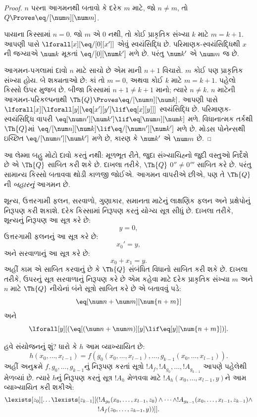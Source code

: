 \begin{proof}
$n$ પરના આગમનથી
બતાવો કે દરેક $m$
માટે, જો $n \neq m$,
તો $Q \Proves \eq/[\num n][\num m]$.

પાયાના કિસ્સામાં
$n = 0$. જો $m$
એ $0$ નથી, તો
કોઈ પ્રાકૃતિક
સંખ્યા $k$ માટે
$m = k + 1$.
આપણી પાસે
$\lforall[x][\eq/[0][x']]$
એવું સ્વયંસિદ્ધિ છે.
પરિમાણક-સ્વયંસિદ્ધિથી
$x$ની જગ્યાએ
$\num k$ મૂકતાં
$\eq/[0][\num k']$
મળે છે. પરંતુ
$\num k'$ એ
$\num m$ જ છે.

આગમન-પગલામાં
દાવો $n$ માટે સાચો
છે એમ માની $n+1$
વિચારો. $m$ કોઈ
પણ પ્રાકૃતિક
સંખ્યા હોય. બે
શક્યતાઓ છે:
કાં તો $m = 0$,
અથવા કોઈ $k$
માટે $m = k+1$.
પહેલો કિસ્સો
ઉપર મુજબ છે.
બીજા કિસ્સામાં
$n+1 \neq k+1$
માનો; ત્યારે
$n \neq k$.
$n$ માટેની
આગમન-પરિકલ્પનાથી
$\Th{Q} \Proves \eq/[\num n][\num k]$.
આપણી પાસે
$\lforall[x][\lforall[y][\eq[x'][y'] \lif \eq[x][y]]]$
સ્વયંસિદ્ધિ છે.
પરિમાણક-સ્વયંસિદ્ધિ
વાપરી
$\eq[\num n'][\num k'] \lif \eq[\num n][\num
  k]$ મળે. વિધાનાત્મક
તર્કથી $\Th{Q}$માં
$\eq/[\num n][\num k] \lif \eq/[\num n'][\num k']$
મળે છે. મોડસ
પોનેન્સથી ઇચ્છિત
$\eq/[\num n'][\num k']$
મળે છે, કારણ કે
$\num k'$ એ
$\num m$ છે.
\end{proof}

આ લેમ્મા બહુ મોટો
દાવો કરતું નથી:
મૂળભૂત રીતે, જુદા
સંખ્યાચિહ્નો જુદી
વસ્તુઓ નિર્દેશે છે
એ $\Th{Q}$ સાબિત
કરી શકે છે. દાખલા
તરીકે, $\Th{Q}$
$0'' \neq 0'''$
સાબિત કરે છે.
પરંતુ સામાન્ય કિસ્સો
બતાવવા થોડી
કાળજી જોઈએ.
આગમન વાપરીએ
છીએ, પણ તે
$\Th{Q}$ની
\emph{બહારનું}
આગમન છે.

શૂન્ય, ઉત્તરગામી ફલન, સરવાળો, ગુણાકાર, સમાનતા માટેનું
લાક્ષણિક ફલન અને પ્રક્ષેપોનું નિરૂપણ કરી શકાશે.
દરેક કિસ્સામાં નિરૂપણ કરતું યોગ્ય સૂત્ર સીધું છે.
દાખલા તરીકે, શૂન્યનું નિરૂપણ આ સૂત્ર કરે છે:
\[
y = 0,
\]
ઉત્તરગામી ફલનનું આ સૂત્ર કરે છે:
\[
x_0' = y,
\]
અને સરવાળાનું આ સૂત્ર કરે છે:
\[
x_0 + x_1 = y.
\]
અહીં કામ એ સાબિત કરવાનું છે કે $\Th{Q}$ સંબંધિત વિધાનો
સાબિત કરી શકે છે. દાખલા તરીકે, ઉપરનું સૂત્ર સરવાળાનું
નિરૂપણ કરે છે એમ કહેવા માટે દરેક પ્રાકૃતિક સંખ્યા
$m$ અને $n$ માટે $\Th{Q}$ નીચેનાં બંને સૂત્રો સાબિત કરે છે
એ બતાવવું પડે:
\[
\eq[\num n + \num m][\num {n+m}]
\]
અને
\[
\lforall[y][(\eq[(\num n + \num m)][y] \lif \eq[y][\num {n+m}])].
\]

હવે સંયોજનનું શું? ધારો કે $h$ આમ વ્યાખ્યાયિત છે:
\[
h(x_0,\dots,x_{l-1}) = f(g_0(x_0,\dots,x_{l-1}), \dots,
g_{k-1}(x_0,\dots,x_{l-1})).
\]
અહીં અનુક્રમે $f,g_0,\dots,g_{k-1}$નું નિરૂપણ
કરતાં સૂત્રો $!A_f, !A_{g_0}, \dots,
!A_{g_{k-1}}$ આપણે પહેલેથી મેળવ્યાં છે. ત્યારે
$h$નું નિરૂપણ કરતું સૂત્ર $!A_h$ મેળવવા માટે
$!A_h(x_0,\dots,x_{l-1},y)$ને આમ વ્યાખ્યાયિત કરી શકીએ:
\begin{multline*}
  \lexists[z_0][\dots \lexists[z_{k-1}][(!A_{g_0}(x_0,\dots,x_{l-1},z_0) \land
  \dots \land !A_{g_{k-1}}(x_0,\dots,x_{l-1},z_{k-1}) \land\\
  !A_f(z_0,\dots,z_{k-1},y))]].
\end{multline*}


